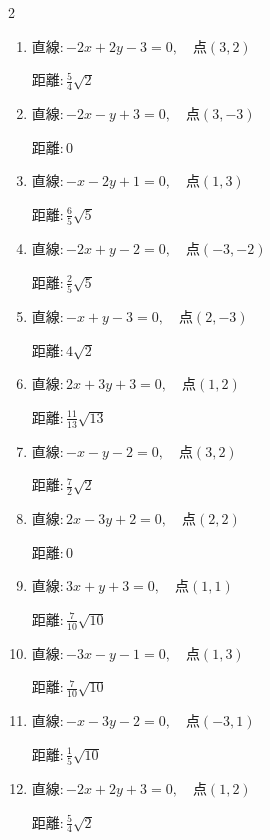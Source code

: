 \begin{multicols}{2}
\begin{enumerate}
  \item $直線:-2x+2y-3=0,\quad 点 ( 3, 2 )$

        $\displaystyle 距離 : \frac{5}{4}\sqrt{2}$

  \item $直線:-2x-y+3=0,\quad 点 ( 3, -3 )$

        $\displaystyle 距離 : 0$

\columnbreak %

\resetques

  \item $直線:-x-2y+1=0,\quad 点 ( 1, 3 )$

        $\displaystyle 距離 : \frac{6}{5}\sqrt{5}$

  \item $直線:-2x+y-2=0,\quad 点 ( -3, -2 )$

        $\displaystyle 距離 : \frac{2}{5}\sqrt{5}$

  \item $直線:-x+y-3=0,\quad 点 ( 2, -3 )$

        $\displaystyle 距離 : 4\sqrt{2}$

  \item $直線:2x+3y+3=0,\quad 点 ( 1, 2 )$

        $\displaystyle 距離 : \frac{11}{13}\sqrt{13}$

  \item $直線:-x-y-2=0,\quad 点 ( 3, 2 )$

        $\displaystyle 距離 : \frac{7}{2}\sqrt{2}$

  \item $直線:2x-3y+2=0,\quad 点 ( 2, 2 )$

        $\displaystyle 距離 : 0$

  \item $直線:3x+y+3=0,\quad 点 ( 1, 1 )$

        $\displaystyle 距離 : \frac{7}{10}\sqrt{10}$

  \item $直線:-3x-y-1=0,\quad 点 ( 1, 3 )$

        $\displaystyle 距離 : \frac{7}{10}\sqrt{10}$

  \item $直線:-x-3y-2=0,\quad 点 ( -3, 1 )$

        $\displaystyle 距離 : \frac{1}{5}\sqrt{10}$

  \item $直線:-2x+2y+3=0,\quad 点 ( 1, 2 )$

        $\displaystyle 距離 : \frac{5}{4}\sqrt{2}$


\end{enumerate}
\end{multicols}
